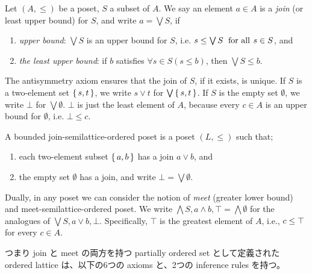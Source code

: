 \documentclass[dvipdfmx,autodetect-engine]{jsarticle}
\begin{document}
\begin{definition}[join]
Let $(A,\leq)$ be a poset, $S$ a subset of $A$. 
We say an element $a \in A$ is a {\em join} 
(or least upper bound) for $S$,
and write $a = \bigvee S$, if
\begin{enumerate}
\item {\em upper bound}:
$\bigvee S$ is an upper bound for $S$,
i.e. $s \leq \bigvee S \hskip 6pt\text{for all}\hskip 4pt s \in S$, and
\item {\em the least upper bound}: 
if $b$ satisfies $\forall s \in S (s \leq b)$, then $\bigvee S \leq b$. 
\end{enumerate}
\end{definition}

The antisymmetry axiom ensures that the join of $S$, if it exists, is unique. 
If $S$ is a two-element set $\set{s,t}$, we write $s \vee t$ for $\bigvee\set{s,t}$. 
If $S$ is the empty set $\emptyset$, we write $\bot$ for $\bigvee\emptyset$. 
$\bot$ is just the least element of $A$,
because every $c \in A$ is an upper bound for $\emptyset$, i.e. $\bot \leq c$. 

\begin{definition}
A bounded join-semilattice-ordered poset is a poset $(L,\leq)$ such that;
\begin{enumerate}
\item  each two-element subset $\set{a,b}$ has a join $a \vee b$, and
\item  the empty set $\emptyset$  has a join, and write $\bot = \bigvee\emptyset$.
\end{enumerate}
\end{definition}

Dually, in any poset we can consider the notion of {\em meet} (greater lower bound)
and meet-semilattice-ordered poset. 
We write $\bigwedge S, a \wedge b, \top = \bigwedge\emptyset$ 
for the analogues of $\bigvee S, a \vee b, \bot$. 
Specifically, $\top$ is the greatest element of $A$,
i.e., $c \leq \top$ for every $c \in A$. 

つまり join と meet の両方を持つ partially ordered set として定義された ordered lattice は、以下の6つの axioms と、2つの inference rules を持つ。

\newcommand{\LTCjoinRules}{
\begin{center}
\begin{prooftree}
\AxiomC{$$} 
  \RightLabel{$\LTCbot$}
\UnaryInfC{$ \LTCbot \fCenter a $}
	\DisplayProof \hskip16pt
\AxiomC{$$} 
\RightLabel{$R1\LTCjoin$}
\UnaryInfC{$ a \fCenter a \LTCjoin b $}
	\DisplayProof \hskip16pt
\AxiomC{$$} 
\RightLabel{$R2\LTCjoin$}
\UnaryInfC{$ b \fCenter a \vee b $}
	\DisplayProof \hskip 32pt
\AxiomC{$a \fCenter c   $} 
\AxiomC{$b \fCenter c   $} 
\RightLabel{$L\LTCjoin$}
\BinaryInfC{$a \LTCjoin b \fCenter c$}
\end{prooftree}
\end{center} 
}
\end{document}
